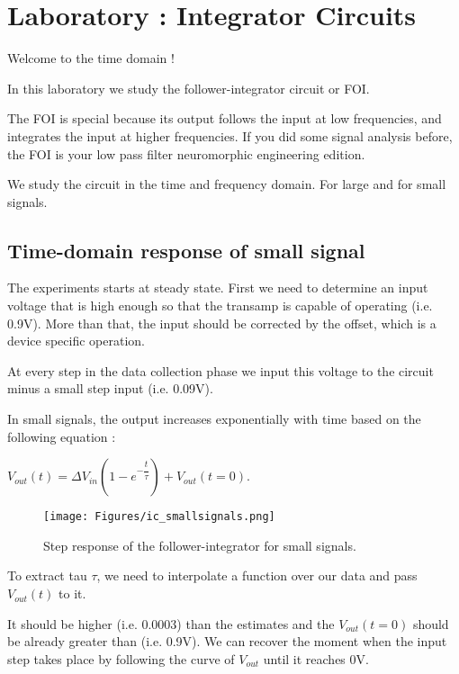 \section{Laboratory : Integrator Circuits }

Welcome to the time domain !

In this laboratory we study the follower-integrator circuit or FOI.

The FOI is special because its output follows the input at low frequencies, and integrates the input at higher  frequencies. If you did some signal analysis before, the FOI is your low pass filter neuromorphic engineering edition. 

We study the circuit in the time and frequency domain. For large and for small signals. 

\subsection{Time-domain response of small signal}

The experiments starts at steady state. First we need to determine an input voltage that is high enough so that the transamp is capable of operating (i.e. 0.9V). More than that, the input should be corrected by the offset, which is a device specific operation.

At every step in the data collection phase we input this voltage to the circuit minus a small step input (i.e. 0.09V).

In small signals, the output increases exponentially with time based on the following equation :  

$V_{out}(t) = \Delta V_{in}\left(1-e^{-\dfrac{t}{\tau}}\right) + V_{out}(t=0)$.


\begin{figure}[H]
    \centering
    \texttt{[image: Figures/ic\_smallsignals.png]}
    \caption{Step response of the follower-integrator for small signals.}
    \label{fig:basalandcerebellum}
\end{figure}



To extract tau $\tau$, we need to interpolate a function over our data and pass $V_{out}(t)$ to it. 

It should be higher (i.e. 0.0003) than the estimates and the $V_{out}(t=0)$ should be already greater than (i.e. 0.9V). We can recover the moment when the input step takes place by following the curve of $V_{out}$ until it reaches 0V. 

